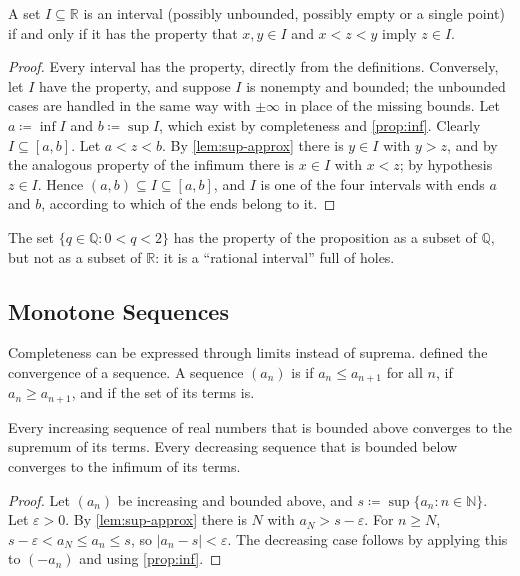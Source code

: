 \begin{proposition}
\label{prop:intervals}
A set $I\subseteq\mathbb R$ is an interval (possibly unbounded, possibly empty or a single point) if and only if it has the property that $x,y\in I$ and $x<z<y$ imply $z\in I$.
\end{proposition}

\begin{proof}
Every interval has the property, directly from the definitions. Conversely, let $I$ have the property, and suppose $I$ is nonempty and bounded; the unbounded cases are handled in the same way with $\pm\infty$ in place of the missing bounds. Let $a\coloneqq\inf I$ and $b\coloneqq\sup I$, which exist by completeness and \cref{prop:inf}. Clearly $I\subseteq[a,b]$. Let $a<z<b$. By \cref{lem:sup-approx} there is $y\in I$ with $y>z$, and by the analogous property of the infimum there is $x\in I$ with $x<z$; by hypothesis $z\in I$. Hence $(a,b)\subseteq I\subseteq[a,b]$, and $I$ is one of the four intervals with ends $a$ and $b$, according to which of the ends belong to it.
\end{proof}

The set $\{q\in\mathbb Q: 0<q<2\}$ has the property of the proposition as a subset of $\mathbb Q$, but not as a subset of $\mathbb R$: it is a ``rational interval'' full of holes.

\subsection{Monotone Sequences}

Completeness can be expressed through limits instead of suprema.  defined the convergence of a sequence. A sequence $(a_n)$ is  if $a_n\le a_{n+1}$ for all $n$,  if $a_n\ge a_{n+1}$, and  if the set of its terms is.

\begin{theorem}
\label{thm:monotone}
Every increasing sequence of real numbers that is bounded above converges to the supremum of its terms. Every decreasing sequence that is bounded below converges to the infimum of its terms.
\end{theorem}

\begin{proof}
Let $(a_n)$ be increasing and bounded above, and $s\coloneqq\sup\{a_n: n\in\mathbb N\}$. Let $\varepsilon>0$. By \cref{lem:sup-approx} there is $N$ with $a_N>s-\varepsilon$. For $n\ge N$, $s-\varepsilon<a_N\le a_n\le s$, so $|a_n-s|<\varepsilon$. The decreasing case follows by applying this to $(-a_n)$ and using \cref{prop:inf}.
\end{proof}


